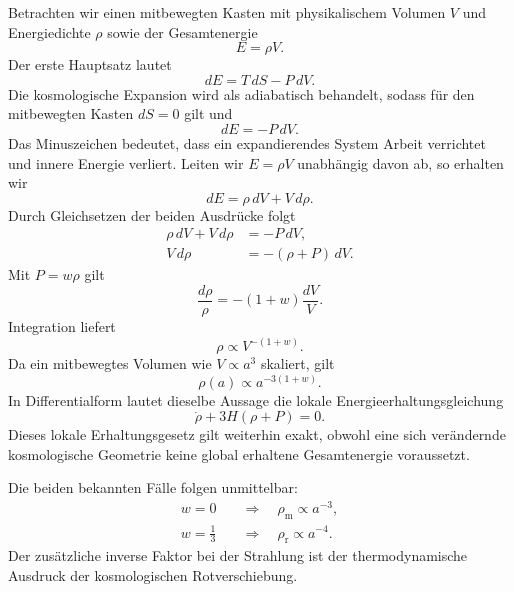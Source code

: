 Betrachten wir einen mitbewegten Kasten mit physikalischem Volumen \(V\) und Energiedichte \(\rho\) sowie der Gesamtenergie
\begin{equation}
E=\rho V.
\end{equation}
Der erste Hauptsatz lautet
\begin{equation}
dE=T\,dS-P\,dV.
\end{equation}
Die kosmologische Expansion wird als adiabatisch behandelt, sodass für den mitbewegten Kasten \(dS=0\) gilt und
\begin{equation}
dE=-P\,dV.
\label{eq:c04-adiabatic-first-law}
\end{equation}
Das Minuszeichen bedeutet, dass ein expandierendes System Arbeit verrichtet und innere Energie verliert. Leiten wir \(E=\rho V\) unabhängig davon ab, so erhalten wir
\begin{equation}
dE=\rho\,dV+V\,d\rho.
\end{equation}
Durch Gleichsetzen der beiden Ausdrücke folgt
\begin{align}
\rho\,dV+V\,d\rho&=-P\,dV,\\
V\,d\rho&=-(\rho+P)\,dV.
\label{eq:c04-volume-continuity}
\end{align}
Mit \(P=w\rho\) gilt
\begin{equation}
\frac{d\rho}{\rho}=-(1+w)\frac{dV}{V}.
\end{equation}
Integration liefert
\begin{equation}
\rho\propto V^{-(1+w)}.
\end{equation}
Da ein mitbewegtes Volumen wie \(V\propto a^3\) skaliert, gilt
\begin{equation}
\boxed{\rho(a)\propto a^{-3(1+w)}}.
\label{eq:c04-density-scaling}
\end{equation}
In Differentialform lautet dieselbe Aussage die lokale Energieerhaltungsgleichung
\begin{equation}
\dot\rho+3H(\rho+P)=0.
\label{eq:c04-continuity}
\end{equation}
Dieses lokale Erhaltungsgesetz gilt weiterhin exakt, obwohl eine sich verändernde kosmologische Geometrie keine global erhaltene Gesamtenergie voraussetzt.

Die beiden bekannten Fälle folgen unmittelbar:
\begin{align}
w=0
&\quad\Longrightarrow\quad
\rho_{\mathrm m}\propto a^{-3},\\
w=\frac13
&\quad\Longrightarrow\quad
\rho_{\mathrm r}\propto a^{-4}.
\end{align}
Der zusätzliche inverse Faktor bei der Strahlung ist der thermodynamische Ausdruck der kosmologischen Rotverschiebung.

